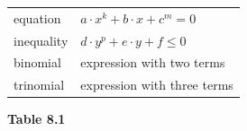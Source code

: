 {\begin{center}
\begin{xtabular*}{\mytablewidth}[t]{|p{10\mystarwidth}|p{10\mystarwidth}|}
        equation &
                  $a\ensuremath{\cdot}{x}^{k}+b\ensuremath{\cdot}x+{c}^{m}=0$
     \tabularnewline{}
        inequality &
                  $d\ensuremath{\cdot}{y}^{p}+e\ensuremath{\cdot}y+f\le 0$
     \tabularnewline{}
        binomial &
        expression with two terms%
     \tabularnewline{}
        trinomial &
        expression with three terms%
     \tabularnewline{}
    \end{xtabular*}
      \end{center}
    \begin{center}{\small\bfseries Table 8.1}\end{center}
        }%
    \par
      \label{m39383*uid4}
